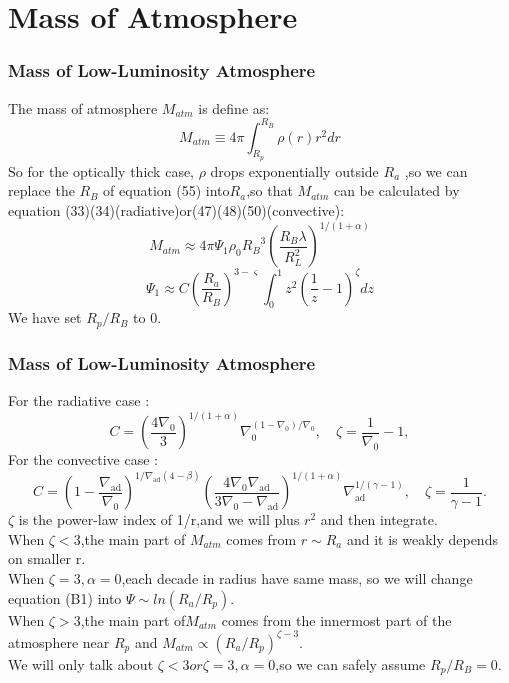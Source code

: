 \documentclass{beamer}
\begin{document}
\section{Mass of Atmosphere}
\begin{frame}
\frametitle{Mass of Low-Luminosity Atmosphere}
The mass of atmosphere $M_{atm}$ is define as:
\begin{equation}
\tag{55}
M_{atm} \equiv 4\pi \int_{R_p}^{R_B} \rho(r) r^2 dr
\end{equation}
So for the optically thick case, $\rho$ drops exponentially outside $R_a$ ,so we can replace the $R_B$ of equation (55) into$R_a$,so that $M_{atm}$ can be calculated by equation (33)(34)(radiative)or(47)(48)(50)(convective):
\begin{equation}
\tag{56}
M_{atm}  \approx 4 \pi \Psi_1 \rho_0 {R_B}^3 {(\frac{R_B \lambda}{R_L^2})}^{1/(1+\alpha)}
\end{equation}
\begin{equation}
\tag{B1}
\Psi_1 \approx C {(\frac{R_a}{R_B})}^{3-\varsigma} \int_{0}^{1} z^2{(\frac{1}{z}-1)}^\zeta dz
\end{equation}
We have set $R_p/R_B$ to 0.\\
\end{frame}

\begin{frame}
\frametitle{Mass of Low-Luminosity Atmosphere}
For the radiative case :
\begin{equation}
\tag{B2}
C = \left( \frac{4 \nabla_0}{3} \right)^{1/(1+\alpha)} \nabla_0^{(1 - \nabla_0)/\nabla_0}, \quad \zeta = \frac{1}{\nabla_0} - 1,
\end{equation}
For the convective case :
\begin{equation}
\tag{B3}
C = \left( 1 - \frac{\nabla_{\text{ad}}}{\nabla_0} \right)^{1/\nabla_{\text{ad}}(4 - \beta)} \left( \frac{4 \nabla_0 \nabla_{\text{ad}}}{3 \nabla_0 - \nabla_{\text{ad}}} \right)^{1/(1+\alpha)} \nabla_{\text{ad}}^{1/(\gamma - 1)}, \quad \zeta = \frac{1}{\gamma - 1}.
\end{equation}
$\zeta$ is the power-law index of 1/r,and we will plus $r^2$ and then integrate.\\
When $\zeta < 3$,the main part of $M_{atm}$ comes from $r \sim R_a$ and it is weakly depends on smaller r.\\
When $\zeta = 3 , \alpha =0$,each decade in radius have same mass, so we will change equation (B1) into $\Psi \sim ln(R_a/R_p)$.\\
When $\zeta > 3$,the main part of$M_{atm}$ comes from the innermost part of the atmosphere near $R_p$ and $M_{atm} \propto {(R_a/R_p)}^{\zeta-3}$.\\
We will only talk about $\zeta < 3 or \zeta = 3 , \alpha =0$,so we can safely assume $R_p/R_B=0$.\\
\end{frame}
\end{document}
